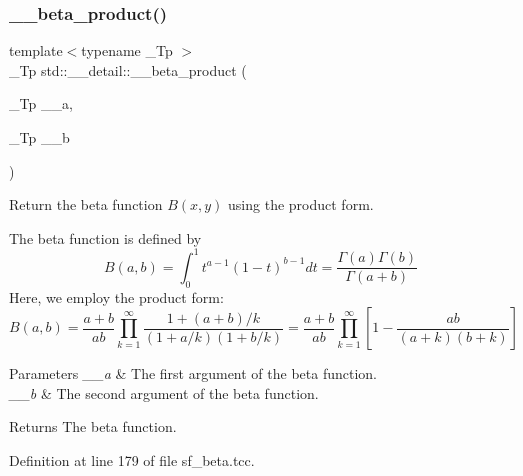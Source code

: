 \mbox{\label{namespacestd_1_1____detail_a9baa688a27befab7fa48ccfb4a87a9ca}} 
\subsubsection{\texorpdfstring{\+\_\+\+\_\+beta\+\_\+product()}{\_\_beta\_product()}}
{\footnotesize\ttfamily template$<$typename \+\_\+\+Tp $>$ \\
\+\_\+\+Tp std\+::\+\_\+\+\_\+detail\+::\+\_\+\+\_\+beta\+\_\+product (\begin{DoxyParamCaption}\item[{\+\_\+\+Tp}]{\+\_\+\+\_\+a,  }\item[{\+\_\+\+Tp}]{\+\_\+\+\_\+b }\end{DoxyParamCaption})}



Return the beta function $B(x,y)$ using the product form. 

The beta function is defined by \[ B(a,b) = \int_0^1 t^{a - 1} (1 - t)^{b - 1} dt = \frac{\Gamma(a)\Gamma(b)}{\Gamma(a+b)} \] Here, we employ the product form\+: \[ B(a,b) = \frac{a + b}{a b} \prod_{k=1}^{\infty} \frac{1 + (a + b) / k}{(1 + a / k) (1 + b / k)} = \frac{a + b}{ab} \prod_{k=1}^{\infty} \left[1 - \frac{ab}{(a + k)(b + k)}\right] \]


\begin{DoxyParams}{Parameters}
{\em \+\_\+\+\_\+a} & The first argument of the beta function. \\
\hline
{\em \+\_\+\+\_\+b} & The second argument of the beta function. \\
\hline
\end{DoxyParams}
\begin{DoxyReturn}{Returns}
The beta function. 
\end{DoxyReturn}


Definition at line 179 of file sf\+\_\+beta.\+tcc.

\mbox{\label{namespacestd_1_1____detail_a4483574682ad034be17c75ef29892b02}} 

